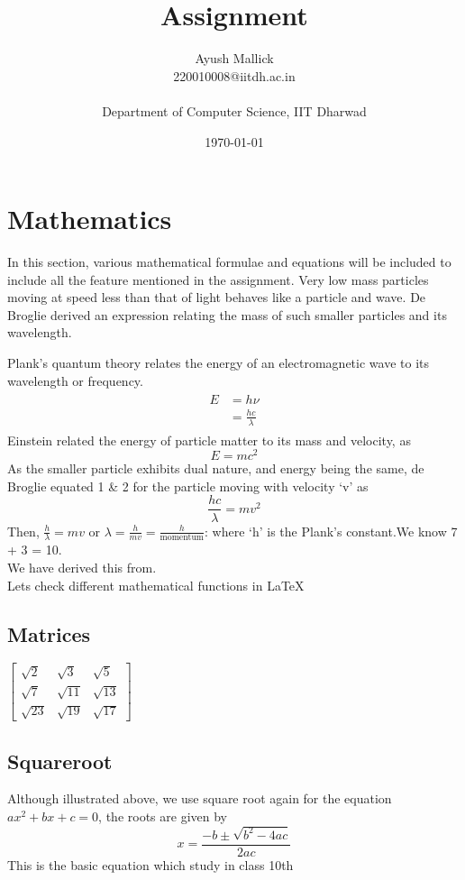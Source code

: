 \documentclass{article}
\title{Assignment}
\author{Ayush Mallick\\220010008@iitdh.ac.in\\\\Department of Computer Science, IIT Dharwad}
\date{\today}
\begin{document}
\maketitle
\newpage
\tableofcontents
\listoffigures
\listoftables
\newpage
\section{Mathematics}
In this section, various mathematical formulae and equations will be included to include all the feature mentioned in the assignment. Very low mass particles moving at speed less than that of light behaves like a particle and wave. De Broglie derived an expression relating the mass of such smaller particles and its wavelength.\par
Plank's quantum theory relates the energy of an electromagnetic wave to its wavelength or frequency.
\begin{align}
\begin{split}
E&=h\nu\\
&=\frac{hc}{\lambda}    
\end{split}
\end{align}
Einstein related the energy of particle matter to its mass and velocity, as
\begin{equation}
E=mc^2
\end{equation}
As the smaller particle exhibits dual nature, and energy being the same, de Broglie equated 1 \& 2 for the particle moving with velocity `v' as
\[\frac{hc}{\lambda}=mv^{2}\]
Then, \(\frac{h}{\lambda}=mv\) or \(\lambda=\frac{h}{mv}=\frac{h}{\text{momentum}}\): where `h' is the Plank's constant.We know 7 + 3 = 10.\\
We have derived this from\cite{verma2008concepts}.\\
Lets check different mathematical functions in \LaTeX
\subsection{Matrices}
\(\begin{bmatrix}
\sqrt{2}&\sqrt{3}&\sqrt{5}\\
\sqrt{7}&\sqrt{11}&\sqrt{13}\\
\sqrt{23}&\sqrt{19}&\sqrt{17}
\end{bmatrix}\)
\subsection{Squareroot}
Although illustrated above, we use square root again for the equation \(ax^2+bx+c=0\), the roots are given by
\[x=\frac{-b \pm \sqrt{b^2-4ac}}{2ac}\]
This is the basic equation which study in class 10th\cite{education2016mathematics}
\newpage
\end{document}
